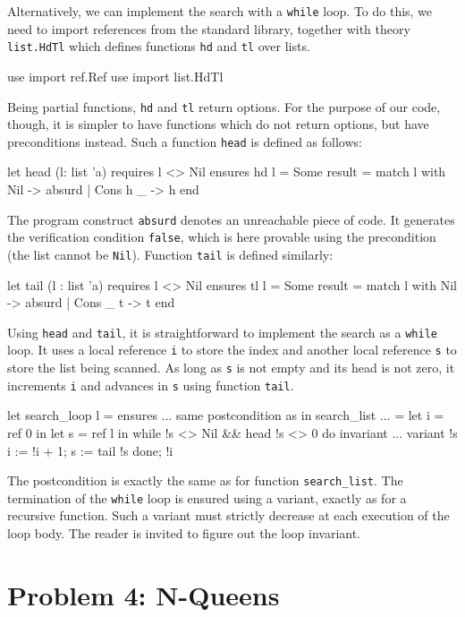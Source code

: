 Alternatively, we can implement the search with a \texttt{while} loop.
To do this, we need to import references from the standard library,
together with theory \texttt{list.HdTl} which defines functions
\texttt{hd} and \texttt{tl} over lists.
\begin{whycode}
  use import ref.Ref
  use import list.HdTl
\end{whycode}
Being partial functions, \texttt{hd} and \texttt{tl} return options.
For the purpose of our code, though, it is simpler to have functions
which do not return options, but have preconditions instead. Such a
function \texttt{head} is defined as follows:
\begin{whycode}
  let head (l: list 'a)
    requires { l <> Nil } ensures { hd l = Some result }
  = match l with Nil -> absurd | Cons h _ -> h end
\end{whycode}
The program construct \texttt{absurd} denotes an unreachable piece of
code. It generates the verification condition \texttt{false}, which is
here provable using the precondition (the list cannot be \texttt{Nil}).
Function \texttt{tail} is defined similarly:
\begin{whycode}
  let tail (l : list 'a)
    requires { l <> Nil } ensures { tl l = Some result }
  = match l with Nil -> absurd | Cons _ t -> t end
\end{whycode}
Using \texttt{head} and \texttt{tail}, it is straightforward to
implement the search as a \texttt{while} loop.
It uses a local reference \texttt{i} to store the index and another
local reference \texttt{s} to store the list being scanned.
As long as \texttt{s} is not empty and its head is not zero, it
increments \texttt{i} and advances in \texttt{s} using function \texttt{tail}.
\begin{whycode}
  let search_loop l =
    ensures { ... same postcondition as in search_list ... }
  = let i = ref 0 in
    let s = ref l in
    while !s <> Nil && head !s <> 0 do
      invariant { ... }
      variant   { !s }
      i := !i + 1;
      s := tail !s
    done;
    !i
\end{whycode}
The postcondition is exactly the same as for function \verb|search_list|.
The termination of the \texttt{while} loop is ensured using a variant,
exactly as for a recursive function. Such a variant must strictly decrease at
each execution of the loop body. The reader is invited to figure out
the loop invariant.

\section{Problem 4: N-Queens}

